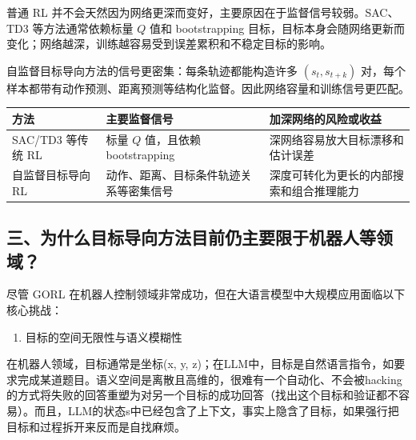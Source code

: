 普通 RL 并不会天然因为网络更深而变好，主要原因在于监督信号较弱。SAC、TD3 等方法通常依赖标量 \(Q\) 值和 bootstrapping 目标，目标本身会随网络更新而变化；网络越深，训练越容易受到误差累积和不稳定目标的影响。

自监督目标导向方法的信号更密集：每条轨迹都能构造许多 \((s_t,s_{t+k})\) 对，每个样本都带有动作预测、距离预测等结构化监督。因此网络容量和训练信号更匹配。

\begin{longtable}[]{@{}
  >{\raggedright\arraybackslash}p{}
  >{\raggedright\arraybackslash}p{}
  >{\raggedright\arraybackslash}p{}@{}}
\toprule
方法 & 主要监督信号 & 加深网络的风险或收益 \\
\midrule
\endhead
SAC/TD3 等传统 RL & 标量 \(Q\) 值，且依赖 bootstrapping & 深网络容易放大目标漂移和估计误差 \\
自监督目标导向 RL & 动作、距离、目标条件轨迹关系等密集信号 & 深度可转化为更长的内部搜索和组合推理能力 \\
\bottomrule
\end{longtable}

\hypertarget{ux4e09ux4e3aux4ec0ux4e48ux76eeux6807ux5bfcux5411ux65b9ux6cd5ux76eeux524dux4ecdux4e3bux8981ux9650ux4e8eux673aux5668ux4ebaux7b49ux9886ux57df}{%
\subsection{三、为什么目标导向方法目前仍主要限于机器人等领域？}\label{ux4e09ux4e3aux4ec0ux4e48ux76eeux6807ux5bfcux5411ux65b9ux6cd5ux76eeux524dux4ecdux4e3bux8981ux9650ux4e8eux673aux5668ux4ebaux7b49ux9886ux57df}}

尽管 GORL 在机器人控制领域非常成功，但在大语言模型中大规模应用面临以下核心挑战：

\begin{enumerate}
\def\labelenumi{\arabic{enumi}.}
\tightlist
\item
  目标的空间无限性与语义模糊性
\end{enumerate}

在机器人领域，目标通常是坐标(x, y, z)；在LLM中，目标是自然语言指令，如要求完成某道题目。语义空间是离散且高维的，很难有一个自动化、不会被hacking的方式将失败的回答重塑为对另一个目标的成功回答（找出这个目标和验证都不容易）。而且，LLM的状态s中已经包含了上下文，事实上隐含了目标，如果强行把目标和过程拆开来反而是自找麻烦。

